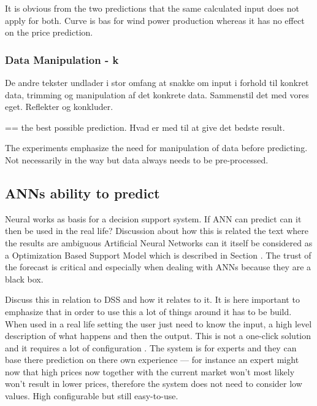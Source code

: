 It is obvious from the two predictions that the same calculated input does not apply for both. Curve is bas for wind power production whereas it has no effect on the price prediction.




\subsubsection{Data Manipulation - k}
De andre tekster undlader i stor omfang at snakke om input i forhold til konkret data, trimming og manipulation af det konkrete data. Sammenstil det med vores eget. Reflekter og konkluder.

== the best possible prediction. Hvad er med til at give det bedste result.

The experiments emphasize the need for manipulation of data before predicting. Not necessarily in the way but data always needs to be pre-processed. 

\subsection{ANNs ability to predict}


Neural works as basis for a decision support system. If ANN can predict can it then be used in the real life? Discussion about how this is related the text where the results are ambiguous 
Artificial Neural Networks can it itself be considered as a Optimization Based Support Model which is described in Section . The trust of the forecast is critical and especially when dealing with ANNs because they are a black box. 

Discuss this in relation to DSS and how it relates to it. It is here important to emphasize that in order to use this a lot of things around it has to be build. When used in a real life setting the user just need to know the input, a high level description of what happens and then the output.
This is not a one-click solution and it requires a lot of configuration . The system is for experts and they can base there prediction on there own experience --- for instance an expert might now that high prices now together with the current market won't most likely won't result in lower prices, therefore the system does not need to consider low values. High configurable but still easy-to-use.

